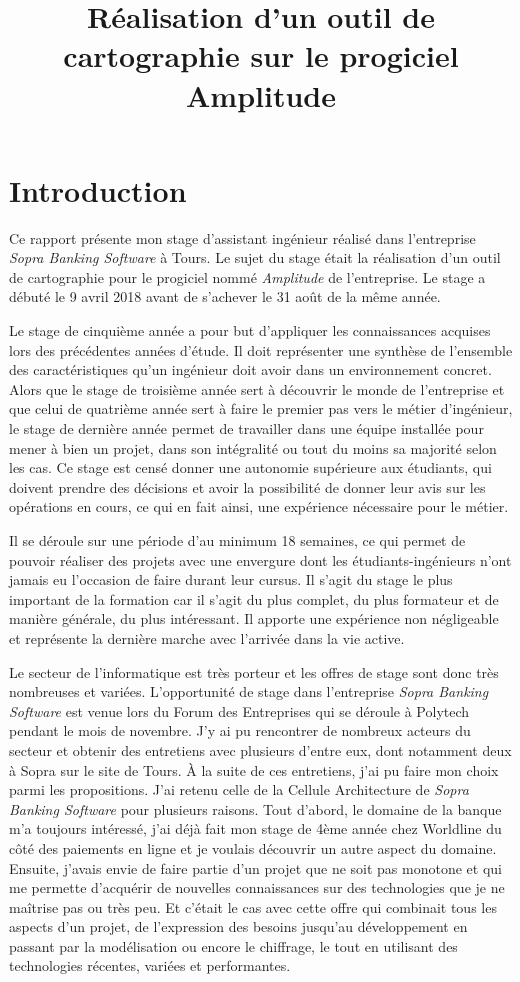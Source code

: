 \documentclass{polytech/polytech}
\title{Réalisation d'un outil de cartographie sur le progiciel Amplitude}
\begin{document}
\chapter*{Introduction}


Ce rapport présente mon stage d'assistant ingénieur réalisé dans l'entreprise \textit{Sopra Banking Software} à Tours. Le sujet du stage était la réalisation d'un outil de cartographie pour le progiciel nommé \textit{Amplitude} de l'entreprise. Le stage a débuté le 9 avril 2018 avant de s'achever le 31 août de la même année.

Le stage de cinquième année a pour but d'appliquer les connaissances acquises lors des précédentes années d'étude. Il doit représenter une synthèse de l'ensemble des caractéristiques qu'un ingénieur doit avoir dans un environnement concret. Alors que le stage de troisième année sert à découvrir le monde de l'entreprise et que celui de quatrième année sert à faire le premier pas vers le métier d'ingénieur, le stage de dernière année permet de travailler dans une équipe installée pour mener à bien un projet, dans son intégralité ou tout du moins sa majorité selon les cas. Ce stage est censé donner une autonomie supérieure aux étudiants, qui doivent prendre des décisions et avoir la possibilité de donner leur avis sur les opérations en cours, ce qui en fait ainsi, une expérience nécessaire pour le métier. 

Il se déroule sur une période d'au minimum 18 semaines, ce qui permet de pouvoir réaliser des projets avec une envergure dont les étudiants-ingénieurs n'ont jamais eu l'occasion de faire durant leur cursus. Il s'agit du stage le plus important de la formation car il s'agit du plus complet, du plus formateur et de manière générale, du plus intéressant. Il apporte une expérience non négligeable et représente la dernière marche avec l'arrivée dans la vie active.

Le secteur de l'informatique est très porteur et les offres de stage sont donc très nombreuses et variées. L'opportunité de stage dans l'entreprise \textit{Sopra Banking Software} est venue lors du Forum des Entreprises qui se déroule à Polytech pendant le mois de novembre. J'y ai pu rencontrer de nombreux acteurs du secteur et obtenir des entretiens avec plusieurs d'entre eux, dont notamment deux à Sopra sur le site de Tours. À la suite de ces entretiens, j'ai pu faire mon choix parmi les propositions. J'ai retenu celle de la Cellule Architecture de \textit{Sopra Banking Software} pour plusieurs raisons. Tout d'abord, le domaine de la banque m'a toujours intéressé, j'ai déjà fait mon stage de 4ème année chez Worldline du côté des paiements en ligne et je voulais découvrir un autre aspect du domaine. Ensuite, j'avais envie de faire partie d'un projet que ne soit pas monotone et qui me permette d'acquérir de nouvelles connaissances sur des technologies que je ne maîtrise pas ou très peu. Et c'était le cas avec cette offre qui combinait tous les aspects d'un projet, de l'expression des besoins jusqu'au développement en passant par la modélisation ou encore le chiffrage, le tout en utilisant des technologies récentes, variées et performantes. 
\end{document}
